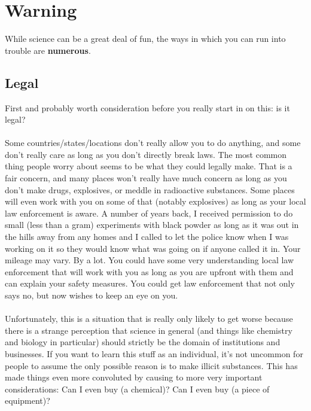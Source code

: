 \documentclass{book}
\begin{document}
\chapter{Warning}
While science can be a great deal of fun, the ways in which you can run into trouble are \textbf{numerous}.\\

\section{Legal}
First and probably worth consideration before you really start in on this: is it legal?\\
\\
Some countries/states/locations don't really allow you to do anything, and some don't really care as long as you don't directly break laws.  The most common thing people worry about seems to be what they could legally make.  That is a fair concern, and many places won't really have much concern as long as you don't make drugs, explosives, or meddle in radioactive substances.  Some places will even work with you on some of that (notably explosives) as long as your local law enforcement is aware.  A number of years back, I received permission to do small (less than a gram) experiments with black powder as long as it was out in the hills away from any homes and I called to let the police know when I was working on it so they would know what was going on if anyone called it in.  Your mileage may vary.  By a lot.  You could have some very understanding local law enforcement that will work with you as long as you are upfront with them and can explain your safety measures.  You could get law enforcement that not only says no, but now wishes to keep an eye on you.\\
\\
Unfortunately, this is a situation that is really only likely to get worse because there is a strange perception that science in general (and things like chemistry and biology in particular) should strictly be the domain of institutions and businesses.  If you want to learn this stuff as an individual, it's not uncommon for people to assume the only possible reason is to make illicit substances.  This has made things even more convoluted by causing to more very important considerations:  Can I even buy (a chemical)?  Can I even buy (a piece of equipment)?\\
\\
\end{document}
